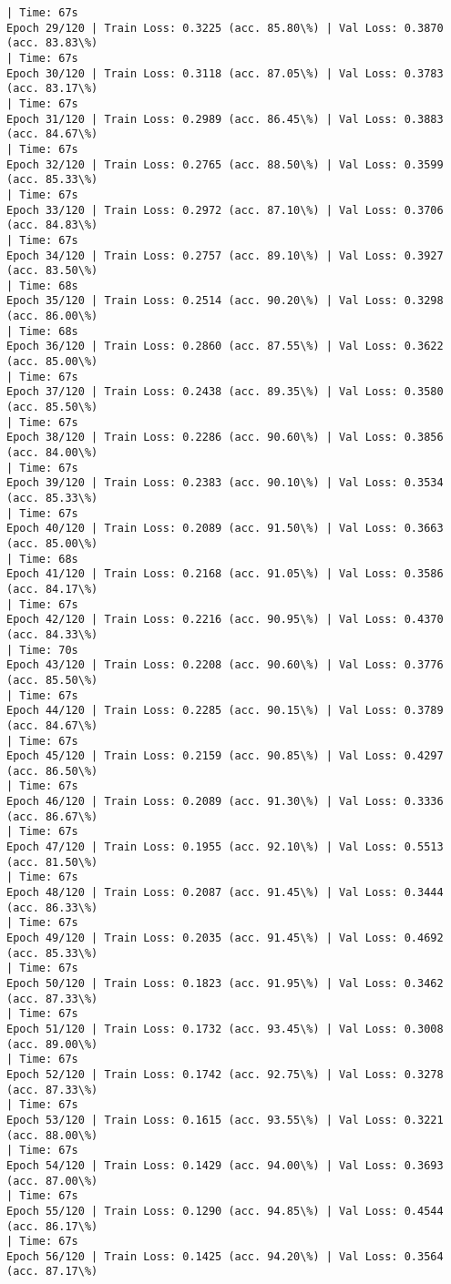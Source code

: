 \documentclass[8pt]{extarticle}
\begin{document}
\begin{Verbatim}[commandchars=\\\{\}]
| Time: 67s
Epoch 29/120 | Train Loss: 0.3225 (acc. 85.80\%) | Val Loss: 0.3870 (acc. 83.83\%)
| Time: 67s
Epoch 30/120 | Train Loss: 0.3118 (acc. 87.05\%) | Val Loss: 0.3783 (acc. 83.17\%)
| Time: 67s
Epoch 31/120 | Train Loss: 0.2989 (acc. 86.45\%) | Val Loss: 0.3883 (acc. 84.67\%)
| Time: 67s
Epoch 32/120 | Train Loss: 0.2765 (acc. 88.50\%) | Val Loss: 0.3599 (acc. 85.33\%)
| Time: 67s
Epoch 33/120 | Train Loss: 0.2972 (acc. 87.10\%) | Val Loss: 0.3706 (acc. 84.83\%)
| Time: 67s
Epoch 34/120 | Train Loss: 0.2757 (acc. 89.10\%) | Val Loss: 0.3927 (acc. 83.50\%)
| Time: 68s
Epoch 35/120 | Train Loss: 0.2514 (acc. 90.20\%) | Val Loss: 0.3298 (acc. 86.00\%)
| Time: 68s
Epoch 36/120 | Train Loss: 0.2860 (acc. 87.55\%) | Val Loss: 0.3622 (acc. 85.00\%)
| Time: 67s
Epoch 37/120 | Train Loss: 0.2438 (acc. 89.35\%) | Val Loss: 0.3580 (acc. 85.50\%)
| Time: 67s
Epoch 38/120 | Train Loss: 0.2286 (acc. 90.60\%) | Val Loss: 0.3856 (acc. 84.00\%)
| Time: 67s
Epoch 39/120 | Train Loss: 0.2383 (acc. 90.10\%) | Val Loss: 0.3534 (acc. 85.33\%)
| Time: 67s
Epoch 40/120 | Train Loss: 0.2089 (acc. 91.50\%) | Val Loss: 0.3663 (acc. 85.00\%)
| Time: 68s
Epoch 41/120 | Train Loss: 0.2168 (acc. 91.05\%) | Val Loss: 0.3586 (acc. 84.17\%)
| Time: 67s
Epoch 42/120 | Train Loss: 0.2216 (acc. 90.95\%) | Val Loss: 0.4370 (acc. 84.33\%)
| Time: 70s
Epoch 43/120 | Train Loss: 0.2208 (acc. 90.60\%) | Val Loss: 0.3776 (acc. 85.50\%)
| Time: 67s
Epoch 44/120 | Train Loss: 0.2285 (acc. 90.15\%) | Val Loss: 0.3789 (acc. 84.67\%)
| Time: 67s
Epoch 45/120 | Train Loss: 0.2159 (acc. 90.85\%) | Val Loss: 0.4297 (acc. 86.50\%)
| Time: 67s
Epoch 46/120 | Train Loss: 0.2089 (acc. 91.30\%) | Val Loss: 0.3336 (acc. 86.67\%)
| Time: 67s
Epoch 47/120 | Train Loss: 0.1955 (acc. 92.10\%) | Val Loss: 0.5513 (acc. 81.50\%)
| Time: 67s
Epoch 48/120 | Train Loss: 0.2087 (acc. 91.45\%) | Val Loss: 0.3444 (acc. 86.33\%)
| Time: 67s
Epoch 49/120 | Train Loss: 0.2035 (acc. 91.45\%) | Val Loss: 0.4692 (acc. 85.33\%)
| Time: 67s
Epoch 50/120 | Train Loss: 0.1823 (acc. 91.95\%) | Val Loss: 0.3462 (acc. 87.33\%)
| Time: 67s
Epoch 51/120 | Train Loss: 0.1732 (acc. 93.45\%) | Val Loss: 0.3008 (acc. 89.00\%)
| Time: 67s
Epoch 52/120 | Train Loss: 0.1742 (acc. 92.75\%) | Val Loss: 0.3278 (acc. 87.33\%)
| Time: 67s
Epoch 53/120 | Train Loss: 0.1615 (acc. 93.55\%) | Val Loss: 0.3221 (acc. 88.00\%)
| Time: 67s
Epoch 54/120 | Train Loss: 0.1429 (acc. 94.00\%) | Val Loss: 0.3693 (acc. 87.00\%)
| Time: 67s
Epoch 55/120 | Train Loss: 0.1290 (acc. 94.85\%) | Val Loss: 0.4544 (acc. 86.17\%)
| Time: 67s
Epoch 56/120 | Train Loss: 0.1425 (acc. 94.20\%) | Val Loss: 0.3564 (acc. 87.17\%)

\end{Verbatim}
\end{document}
